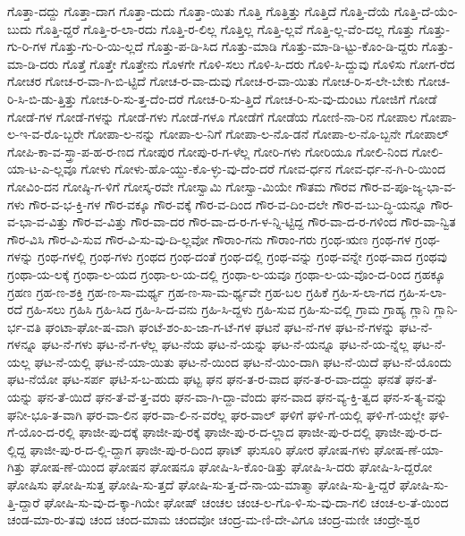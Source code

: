 {ಗೊತ್ತಾ-ದದ್ದು
ಗೊತ್ತಾ-ದಾಗ
ಗೊತ್ತಾ-ದುದು
ಗೊತ್ತಾ-ಯಿತು
ಗೊತ್ತಿ
ಗೊತ್ತಿತ್ತು
ಗೊತ್ತಿದೆ
ಗೊತ್ತಿ-ದೆಯೆ
ಗೊತ್ತಿ-ದೆ-ಯೆಂ-ಬುದು
ಗೊತ್ತಿ-ದ್ದರೆ
ಗೊತ್ತಿ-ರ-ಲಾ-ರದು
ಗೊತ್ತಿ-ರ-ಲಿಲ್ಲ
ಗೊತ್ತಿಲ್ಲ
ಗೊತ್ತಿ-ಲ್ಲವೆ
ಗೊತ್ತಿ-ಲ್ಲ-ವೆಂ-ದಲ್ಲ
ಗೊತ್ತು
ಗೊತ್ತು-ಗು-ರಿ-ಗಳ
ಗೊತ್ತು-ಗು-ರಿ-ಯಿ-ಲ್ಲದೆ
ಗೊತ್ತು-ಪ-ಡಿ-ಸಿದ
ಗೊತ್ತು-ಮಾಡಿ
ಗೊತ್ತು-ಮಾ-ಡಿ-ಟ್ಟು-ಕೊಂ-ಡಿ-ದ್ದರು
ಗೊತ್ತು-ಮಾ-ಡಿ-ದರು
ಗೊತ್ತೆ
ಗೊತ್ತೇ
ಗೊತ್ತೇನು
ಗೊಳಗೇ
ಗೊಳಿ-ಸಲು
ಗೊಳಿ-ಸಿ-ದರು
ಗೊಳಿ-ಸಿ-ದ್ದುವು
ಗೊಳಿಸು
ಗೋಗ-ರೆದ
ಗೋಚರ
ಗೋಚ-ರ-ವಾ-ಗಿ-ಬಿ-ಟ್ಟಿದೆ
ಗೋಚ-ರ-ವಾ-ದುವು
ಗೋಚ-ರ-ವಾ-ಯಿತು
ಗೋಚ-ರಿ-ಸ-ಲೇ-ಬೇಕು
ಗೋಚ-ರಿ-ಸಿ-ಬಿ-ಡು-ತ್ತಿತ್ತು
ಗೋಚ-ರಿ-ಸು-ತ್ತ-ದೆಂ-ದರೆ
ಗೋಚ-ರಿ-ಸು-ತ್ತಿದೆ
ಗೋಚ-ರಿ-ಸು-ವು-ದುಂಟು
ಗೋಜಿಗೆ
ಗೋಡೆ
ಗೋಡೆ-ಗಳ
ಗೋಡೆ-ಗಳನ್ನು
ಗೋಡೆ-ಗಳು
ಗೋಡೆ-ಗಳೂ
ಗೋಡೆಗೆ
ಗೋಡೆಯ
ಗೋಣಿ-ನಾ-ರಿನ
ಗೋಪಾಲ
ಗೋಪಾ-ಲ-ಇ-ವ-ರೊ-ಬ್ಬರೇ
ಗೋಪಾ-ಲ-ನನ್ನು
ಗೋಪಾ-ಲ-ನಿಗೆ
ಗೋಪಾ-ಲ-ನೊ-ಡನೆ
ಗೋಪಾ-ಲ-ನೊ-ಬ್ಬನೇ
ಗೋಪಾಲ್
ಗೋಪಿ-ಕಾ-ವ-ಸ್ತ್ರಾ-ಪ-ಹ-ರ-ಣದ
ಗೋಪುರ
ಗೋಪು-ರ-ಗ-ಳೆಲ್ಲ
ಗೋರಿ-ಗಳು
ಗೋರಿಯೂ
ಗೋಲಿ-ನಿಂದ
ಗೋಲಿ-ಯಾ-ಟ-ಎ-ಲ್ಲವೂ
ಗೋಳು
ಗೋಳು-ಹೊ-ಯ್ದು-ಕೊ-ಳ್ಳು-ವು-ದೆಂ-ದರೆ
ಗೋವ-ರ್ಧನ
ಗೋವ-ರ್ಧ-ನ-ಗಿ-ರಿ-ಯಿಂದ
ಗೋವಿಂ-ದನ
ಗೋಷ್ಠಿ-ಗ-ಳಿಗೆ
ಗೋಸ್ಕ-ರವೇ
ಗೋಸ್ವಾಮಿ
ಗೋಸ್ವಾ-ಮಿಯೇ
ಗೌತಮ
ಗೌರವ
ಗೌರ-ವ-ಪೂ-ಜ್ಯ-ಭಾ-ವ-ಗಳು
ಗೌರ-ವ-ಭ-ಕ್ತಿ-ಗಳ
ಗೌರ-ವಕ್ಕೂ
ಗೌರ-ವಕ್ಕೆ
ಗೌರ-ವ-ದಿಂದ
ಗೌರ-ವ-ದಿಂ-ದಲೇ
ಗೌರ-ವ-ಬು-ದ್ಧಿ-ಯನ್ನೂ
ಗೌರ-ವ-ಭಾ-ವ-ವಿತ್ತು
ಗೌರ-ವ-ವಿತ್ತು
ಗೌರ-ವಾ-ದರ
ಗೌರ-ವಾ-ದ-ರ-ಗ-ಳ-ನ್ನಿ-ಟ್ಟಿದ್ದ
ಗೌರ-ವಾ-ದ-ರ-ಗಳಿಂದ
ಗೌರ-ವಾ-ನ್ವಿತ
ಗೌರ-ವಿಸಿ
ಗೌರ-ವಿ-ಸುವ
ಗೌರ-ವಿ-ಸು-ವು-ದಿ-ಲ್ಲವೋ
ಗೌರಾಂ-ಗನು
ಗೌರಾಂ-ಗರು
ಗ್ರಂಥ-ಋಣ
ಗ್ರಂಥ-ಗಳ
ಗ್ರಂಥ-ಗಳನ್ನು
ಗ್ರಂಥ-ಗಳಲ್ಲಿ
ಗ್ರಂಥ-ಗಳು
ಗ್ರಂಥದ
ಗ್ರಂಥ-ದಂತೆ
ಗ್ರಂಥ-ದಲ್ಲಿ
ಗ್ರಂಥ-ವನ್ನು
ಗ್ರಂಥ-ವನ್ನೇ
ಗ್ರಂಥ-ವಾದ
ಗ್ರಂಥವು
ಗ್ರಂಥಾ-ಯ-ಲಕ್ಕೆ
ಗ್ರಂಥಾ-ಲ-ಯದ
ಗ್ರಂಥಾ-ಲ-ಯ-ದಲ್ಲಿ
ಗ್ರಂಥಾ-ಲ-ಯವೂ
ಗ್ರಂಥಾ-ಲ-ಯ-ವೊಂ-ದ-ರಿಂದ
ಗ್ರಹಕ್ಕೂ
ಗ್ರಹಣ
ಗ್ರಹ-ಣ-ಶಕ್ತಿ
ಗ್ರಹ-ಣ-ಸಾ-ಮರ್ಥ್ಯ
ಗ್ರಹ-ಣ-ಸಾ-ಮ-ರ್ಥ್ಯವೇ
ಗ್ರಹ-ಬಲ
ಗ್ರಹಿಕೆ
ಗ್ರಹಿ-ಸ-ಲಾ-ಗದ
ಗ್ರಹಿ-ಸ-ಲಾ-ರದೆ
ಗ್ರಹಿ-ಸಲು
ಗ್ರಹಿಸಿ
ಗ್ರಹಿ-ಸಿದ
ಗ್ರಹಿ-ಸಿ-ದ-ವನು
ಗ್ರಹಿ-ಸಿ-ದ್ದಳು
ಗ್ರಹಿ-ಸುವ
ಗ್ರಹಿ-ಸು-ವಲ್ಲಿ
ಗ್ರಾಮ
ಗ್ರಾಹ್ಯ
ಗ್ಲಾನಿ
ಗ್ಲಾನಿ-ರ್ಭ-ವತಿ
ಘಂಟಾ-ಘೋ-ಷ-ವಾಗಿ
ಘಂಟೆ-ಶಂ-ಖ-ಜಾ-ಗ-ಟೆ-ಗಳ
ಘಟನೆ
ಘಟ-ನೆ-ಗಳ
ಘಟ-ನೆ-ಗಳನ್ನು
ಘಟ-ನೆ-ಗಳನ್ನೂ
ಘಟ-ನೆ-ಗಳು
ಘಟ-ನೆ-ಗ-ಳೆಲ್ಲ
ಘಟ-ನೆಯ
ಘಟ-ನೆ-ಯನ್ನು
ಘಟ-ನೆ-ಯನ್ನೂ
ಘಟ-ನೆ-ಯ-ನ್ನೆಲ್ಲ
ಘಟ-ನೆ-ಯಲ್ಲ
ಘಟ-ನೆ-ಯಲ್ಲಿ
ಘಟ-ನೆ-ಯಾ-ಯಿತು
ಘಟ-ನೆ-ಯಿಂದ
ಘಟ-ನೆ-ಯಿಂ-ದಾಗಿ
ಘಟ-ನೆ-ಯಿದೆ
ಘಟ-ನೆ-ಯೊಂದು
ಘಟ-ನೆಯೋ
ಘಟ-ಸರ್ಪ
ಘಟಿ-ಸ-ಬ-ಹುದು
ಘಟ್ಟ
ಘನ
ಘನ-ತ-ರ-ವಾದ
ಘನ-ತ-ರ-ವಾ-ದದ್ದು
ಘನತೆ
ಘನ-ತೆ-ಯನ್ನು
ಘನ-ತೆ-ಯಿದೆ
ಘನ-ತೆ-ವೆ-ತ್ತ-ವರು
ಘನ-ವಾ-ಗಿ-ದ್ದಾ-ವೆಂದು
ಘನ-ವಾದ
ಘನ-ವ್ಯ-ಕ್ತಿ-ತ್ವದ
ಘನ-ಸ-ತ್ಯ-ವನ್ನು
ಘನೀ-ಭೂ-ತ-ವಾಗಿ
ಘರ-ವಾ-ಲಿನ
ಘರ-ವಾ-ಲಿ-ನ-ವರೆಲ್ಲ
ಘರ-ವಾಲ್
ಘಳಿಗೆ
ಘಳಿ-ಗೆ-ಯಲ್ಲಿ
ಘಳಿ-ಗೆ-ಯಲ್ಲೇ
ಘಳಿ-ಗೆ-ಯೊಂ-ದ-ರಲ್ಲಿ
ಘಾಜೀ-ಪು-ದಕ್ಕೆ
ಘಾಜೀ-ಪು-ರಕ್ಕೆ
ಘಾಜೀ-ಪು-ರ-ದ-ಲ್ಲಾದ
ಘಾಜೀ-ಪು-ರ-ದಲ್ಲಿ
ಘಾಜೀ-ಪು-ರ-ದ-ಲ್ಲಿದ್ದ
ಘಾಜೀ-ಪು-ರ-ದ-ಲ್ಲಿ-ದ್ದಾಗ
ಘಾಜೀ-ಪು-ರ-ದಿಂದ
ಘಾಟ್
ಘುಸೂರಿ
ಘೋರ
ಘೋಷ-ಗಳು
ಘೋಷ-ಣೆ-ಯಾ-ಗಿತ್ತು
ಘೋಷ-ಣೆ-ಯಿಂದ
ಘೋಷನ
ಘೋಷನೂ
ಘೋಷಿ-ಸಿ-ಕೊಂ-ಡಿತ್ತು
ಘೋಷಿ-ಸಿ-ದರು
ಘೋಷಿ-ಸಿ-ದ್ದರೋ
ಘೋಷಿಸು
ಘೋಷಿ-ಸುತ್ತ
ಘೋಷಿ-ಸು-ತ್ತದೆ
ಘೋಷಿ-ಸು-ತ್ತ-ದೆ-ನಾ-ಯ-ಮಾತ್ಮಾ
ಘೋಷಿ-ಸು-ತ್ತಿ-ದ್ದರೆ
ಘೋಷಿ-ಸು-ತ್ತಿ-ದ್ದಾರೆ
ಘೋಷಿ-ಸು-ವು-ದ-ಕ್ಕಾ-ಗಿಯೇ
ಘೋಷ್
ಚಂಚಲ
ಚಂಚ-ಲ-ಗೊ-ಳಿ-ಸು-ವು-ದಾ-ಗಲಿ
ಚಂಚ-ಲ-ತೆ-ಯಿಂದ
ಚಂಡ-ಮಾ-ರು-ತವು
ಚಂದ
ಚಂದ-ಮಾಮ
ಚಂದವೋ
ಚಂದ್ರ-ಮ-ಣಿ-ದೇ-ವಿಗೂ
ಚಂದ್ರ-ಮಣೀ
ಚಂದ್ರೇ-ಶ್ವರ
}
